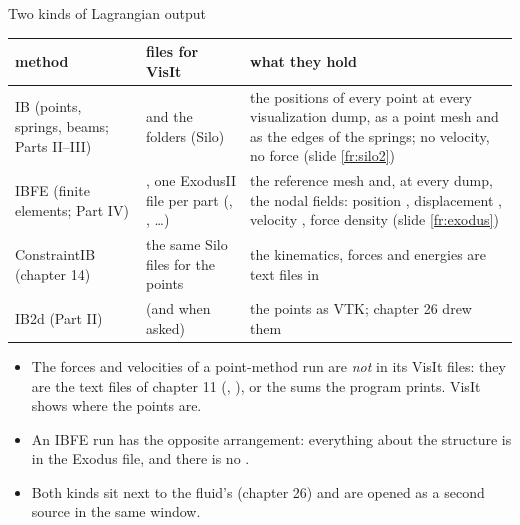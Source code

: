 \documentclass[aspectratio=169,11pt]{beamer}
\begin{document}
\begin{frame}{Two kinds of Lagrangian output}
\label{fr:kinds}
\footnotesize
\begin{tabular}{@{}L{0.17\textwidth}L{0.30\textwidth}L{0.45\textwidth}@{}}
\toprule
method & files for VisIt & what they hold \\
\midrule
IB (points, springs, beams; Parts II--III) &  and the  folders (Silo) & the positions of every point at every visualization dump, as a point mesh and as the edges of the springs; no velocity, no force (slide \ref{fr:silo2}) \\
IBFE (finite elements; Part IV) & , one ExodusII file per part (, , \ldots) & the reference mesh and, at every dump, the nodal fields: position , displacement , velocity , force density  (slide \ref{fr:exodus}) \\
ConstraintIB (chapter 14) & the same Silo files for the points & the kinematics, forces and energies are text files in  \\
IB2d (Part II) &  (and  when asked) & the points as VTK; chapter 26 drew them \\
\bottomrule
\end{tabular}

\begin{itemize}
  \item The forces and velocities of a point-method run are \emph{not} in its VisIt files: they are the  text files of chapter 11 (, ), or the sums the program prints. VisIt shows where the points are.
  \item An IBFE run has the opposite arrangement: everything about the structure is in the Exodus file, and there is no .
  \item Both kinds sit next to the fluid's  (chapter 26) and are opened as a second source in the same window.
\end{itemize}
\end{frame}
\end{document}

